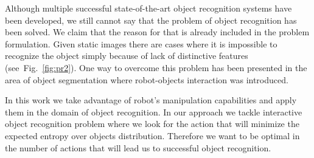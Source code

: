 \documentclass[conference]{IEEEtran}
\newcommand{\figref}[1]{Fig.~\ref{#1}}
\begin{document}

    Although multiple successful state-of-the-art object recognition systems have been developed, we still cannot say that the problem of object recognition has been solved.
    We claim that the reason for that is already included in the problem formulation. Given static images there are cases where it is impossible to recognize the object simply because of lack of distinctive features (see~\figref{fig:pr2}). One way to overcome this problem has been presented in the area of object segmentation where robot-objects interaction was introduced. 

    In this work we take advantage of robot's manipulation capabilities and apply them in the domain of object recognition. In our approach we tackle interactive object recognition problem where we look for the action that will minimize the expected entropy over objects distribution. Therefore we want to be optimal in the number of actions that will lead us to successful object recognition.
\end{document}
